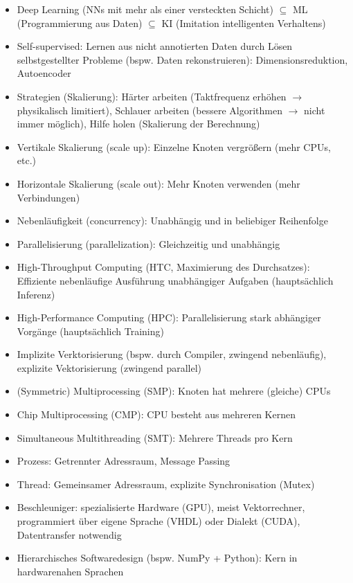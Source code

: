 \documentclass[11pt]{scrartcl}
\begin{document}
\begin{itemize}
    \item Deep Learning (NNs mit mehr als einer versteckten Schicht) $\subseteq$ 
    ML (Programmierung aus Daten) $\subseteq$ 
    KI (Imitation intelligenten Verhaltens)
    \item Self-supervised: Lernen aus nicht annotierten Daten durch Lösen selbstgestellter
    Probleme (bspw. Daten rekonstruieren): Dimensionsreduktion, Autoencoder
    \item Strategien (Skalierung): Härter arbeiten (Taktfrequenz erhöhen $\rightarrow$ 
    physikalisch limitiert), Schlauer arbeiten (bessere Algorithmen $\rightarrow$ nicht immer
    möglich), Hilfe holen (Skalierung der Berechnung)
    \item Vertikale Skalierung (scale up): Einzelne Knoten vergrößern (mehr CPUs, etc.)
    \item Horizontale Skalierung (scale out): Mehr Knoten verwenden (mehr Verbindungen)
    \item Nebenläufigkeit (concurrency): Unabhängig und in beliebiger Reihenfolge
    \item Parallelisierung (parallelization): Gleichzeitig und unabhängig
    \item High-Throughput Computing (HTC, Maximierung des Durchsatzes): Effiziente nebenläufige 
    Ausführung unabhängiger Aufgaben (hauptsächlich Inferenz)
    \item High-Performance Computing (HPC): Parallelisierung stark abhängiger Vorgänge 
    (hauptsächlich Training)
    \item Implizite Verktorisierung (bspw. durch Compiler, zwingend nebenläufig), explizite 
    Vektorisierung (zwingend parallel)
    \item (Symmetric) Multiprocessing (SMP): Knoten hat mehrere (gleiche) CPUs
    \item Chip Multiprocessing (CMP): CPU besteht aus mehreren Kernen
    \item Simultaneous Multithreading (SMT): Mehrere Threads pro Kern
    \item Prozess: Getrennter Adressraum, Message Passing
    \item Thread: Gemeinsamer Adressraum, explizite Synchronisation (Mutex)
    \item Beschleuniger: spezialisierte Hardware (GPU), meist Vektorrechner, programmiert
    über eigene Sprache (VHDL) oder Dialekt (CUDA), Datentransfer notwendig
    \item Hierarchisches Softwaredesign (bspw. NumPy + Python): Kern in hardwarenahen Sprachen 

\end{itemize}
\end{document}
